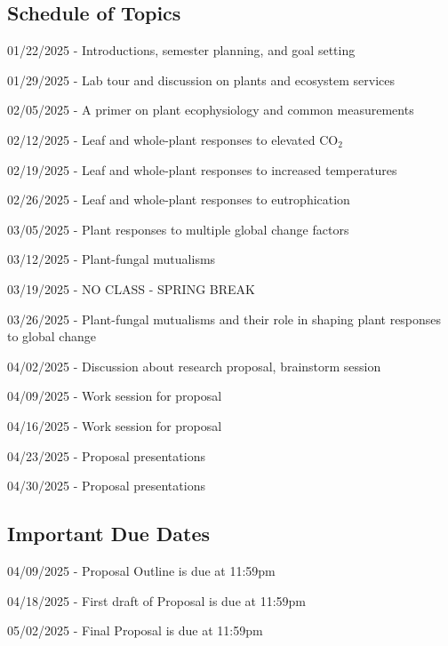 \documentclass[12pt, notitlepage]{article}   	%
\begin{document}
{\subsection{Schedule of Topics}
01/22/2025 - Introductions, semester planning, and goal setting \par
01/29/2025 - Lab tour and discussion on plants and ecosystem services\par
02/05/2025 - A primer on plant ecophysiology and common measurements \par
02/12/2025 - Leaf and whole-plant responses to elevated CO$_2$ \par
02/19/2025 - Leaf and whole-plant responses to increased temperatures \par
02/26/2025 - Leaf and whole-plant responses to eutrophication \par
03/05/2025 - Plant responses to multiple global change factors \par
03/12/2025 - Plant-fungal mutualisms \par
03/19/2025 - NO CLASS - SPRING BREAK \par
03/26/2025 - Plant-fungal mutualisms and their role in shaping plant responses to global change \par
04/02/2025 - Discussion about research proposal, brainstorm session \par
04/09/2025 - Work session for proposal \par
04/16/2025 - Work session for proposal \par
04/23/2025 - Proposal presentations \par
04/30/2025 - Proposal presentations \par

\subsection{Important Due Dates}
04/09/2025 - Proposal Outline is due at 11:59pm \par
04/18/2025 - First draft of Proposal is due at 11:59pm \par
05/02/2025 - Final Proposal is due at 11:59pm \par
} %
\end{document}
